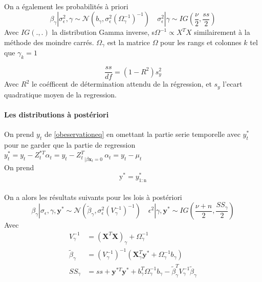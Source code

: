 \documentclass{article}
\theoremstyle{definition}
\theoremstyle{remark}
\begin{document}
{\paragraph{}
On a également les probabilités à priori
\[
	\beta_{\gamma}\left|\sigma_{\epsilon}^{2}, \gamma \sim \mathcal{N}\left(b_{\gamma},
	\sigma_{\epsilon}^{2}\left(\Omega_{\gamma}^{-1}\right)^{-1}\right) \quad \sigma_{\epsilon}^{2}\right| \gamma \sim IG\left(\frac{\nu}{2}, \frac{s s}{2}\right)
	\]
	Avec $IG(.,.)$ la distribution Gamma inverse, s$\Omega^{-1}\propto X^{T} X$ similairement à la méthode des moindre carrés. $\Omega_{\gamma}$ est la matrice $\Omega$
	pour les rangs et colonnes $k$ tel que $\gamma_k  = 1$  
	
	\begin{equation}
		\frac{s s}{d f}=\left(1-R^{2}\right) s_{y}^{2}
	\end{equation}
	Avec $R^2$ le coéfficent de détermination attendu de la régression, et $s_{y}$ l'ecart quadratique moyen de la regression.
	
\paragraph{Les distributions à postériori \\}
On prend $y_t$ de \ref{obeservationeq} en omettant la partie serie temporelle avec $y_{t}^{*}$ pour ne garder que la partie de regression\\ 
$y_{t}^{*}=y_{t}-Z_{t}^{* T} \alpha_{t} = y_{t}-{Z_{t}^{T}}_{ | \beta \mathbf{x}_t = 0} \ \alpha_{t} = y_t - \mu_t$ \\
On prend $$\mathrm{y}^{*}=y_{\mathrm{1:n}}^{*}$$

\paragraph{}
On a alors les résultats suivants pour les lois à postériori
\begin{equation}
	\beta_{\gamma}\left|\sigma_{\epsilon}, \gamma, \mathbf{y}^{*} \sim \mathcal{N}\left(\tilde{\beta}_{\gamma}, 
	\sigma_{\epsilon}^{2}\left(V_{\gamma}^{-1}\right)^{-1}\right) \quad 
	{\epsilon}^{2}\right| \gamma, \mathbf{y}^{*} \sim IG\left(\frac{\nu+n}{2}, \frac{S S_{\gamma}}{2}\right)
\end{equation}
Avec 
\begin{equation}
\begin{aligned}
V_{\gamma}^{-1} &=\left(\mathbf{X}^{T} \mathbf{X}\right)_{\gamma}+\Omega_{\gamma}^{-1} \\
 \tilde{\beta}_{\gamma} &=\left(V_{\gamma}^{-1}\right)^{-1}\left(\mathbf{X}_{\gamma}^{T} \mathbf{y}^{*}+\Omega_{\gamma}^{-1} b_{\gamma}\right) \\ 
SS_{\gamma}& =ss+\mathbf{y}^{* T} \mathbf{y}^{*}+b_{\gamma}^{T} \Omega_{\gamma}^{-1} b_{\gamma}-\tilde{\beta}_{\gamma}^{T} V_{\gamma}^{-1} \tilde{\beta}_{\gamma}
\end{aligned}
\end{equation}

}
\end{document}
